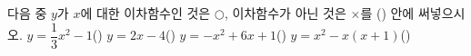 다음 중 $y$가 $x$에 대한 이차함수인 것은 $\bigcirc$, 이차함수가 아닌 것은 $\times$를 (\quad) 안에 써넣으시오.
 $y=\dfrac{1}{3}x^2-1$\hfill(\qquad)
 $y=2x-4$\hfill(\qquad)
 $y=-x^2+6x+1$\hfill(\qquad)
 $y=x^2-x(x+1)$\hfill(\qquad)
